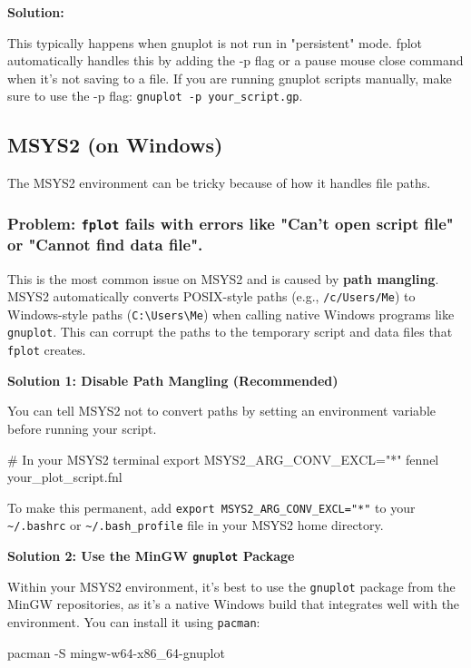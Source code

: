 \documentclass[12pt, letterpaper]{article}
\begin{document}
	\textbf{Solution:}
	
	This typically happens when gnuplot is not run in "persistent" mode. fplot automatically handles this by adding the -p flag or a pause mouse close command when it's not saving to a file. If you are running gnuplot scripts manually, make sure to use the -p flag: \texttt{gnuplot -p your\_script.gp}.
	
	\subsection{MSYS2 (on Windows)}
	
	The MSYS2 environment can be tricky because of how it handles file paths.
	
	\subsubsection*{Problem: \texttt{fplot} fails with errors like "Can't open script file" or "Cannot find data file".}
	
	This is the most common issue on MSYS2 and is caused by \textbf{path mangling}. MSYS2 automatically converts POSIX-style paths (e.g., \texttt{/c/Users/Me}) to Windows-style paths (\texttt{C:\textbackslash Users\textbackslash Me}) when calling native Windows programs like \texttt{gnuplot}. This can corrupt the paths to the temporary script and data files that \texttt{fplot} creates.
	
	\textbf{Solution 1: Disable Path Mangling (Recommended)}
	
	You can tell MSYS2 not to convert paths by setting an environment variable before running your script.
	
	\begin{bashcode}
# In your MSYS2 terminal
export MSYS2_ARG_CONV_EXCL="*"
fennel your_plot_script.fnl
	\end{bashcode}
	
	To make this permanent, add \texttt{export MSYS2\_ARG\_CONV\_EXCL="*"} to your \texttt{\textasciitilde/.bashrc} or \texttt{\textasciitilde/.bash\_profile} file in your MSYS2 home directory.
	
	\textbf{Solution 2: Use the MinGW \texttt{gnuplot} Package}
	
	Within your MSYS2 environment, it's best to use the \texttt{gnuplot} package from the MinGW repositories, as it's a native Windows build that integrates well with the environment. You can install it using \texttt{pacman}:
	
	\begin{bashcode}
pacman -S mingw-w64-x86_64-gnuplot
	\end{bashcode}
	
\end{document}
